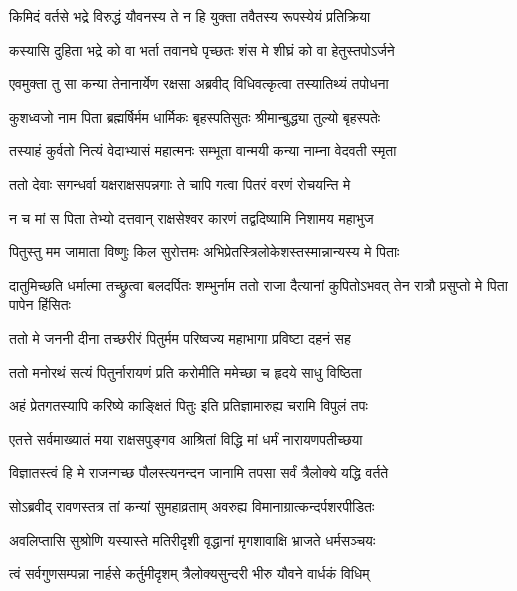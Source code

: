 \twolineshloka
{किमिदं वर्तसे भद्रे विरुद्धं यौवनस्य ते}
{न हि युक्ता तवैतस्य रूपस्येयं प्रतिक्रिया} %

\twolineshloka
{कस्यासि दुहिता भद्रे को वा भर्ता तवानघे}
{पृच्छतः शंस मे शीघ्रं को वा हेतुस्तपोऽर्जने} %

\twolineshloka
{एवमुक्ता तु सा कन्या तेनानार्येण रक्षसा}
{अब्रवीद् विधिवत्कृत्वा तस्यातिथ्यं तपोधना} %

\twolineshloka
{कुशध्वजो नाम पिता ब्रह्मर्षिर्मम धार्मिकः}
{बृहस्पतिसुतः श्रीमान्बुद्ध्या तुल्यो बृहस्पतेः} %

\twolineshloka
{तस्याहं कुर्वतो नित्यं वेदाभ्यासं महात्मनः}
{सम्भूता वान्मयी कन्या नाम्ना वेदवती स्मृता} %

\twolineshloka
{ततो देवाः सगन्धर्वा यक्षराक्षसपन्नगाः}
{ते चापि गत्वा पितरं वरणं रोचयन्ति मे} %

\twolineshloka
{न च मां स पिता तेभ्यो दत्तवान् राक्षसेश्वर}
{कारणं तद्वदिष्यामि निशामय महाभुज} %

\twolineshloka
{पितुस्तु मम जामाता विष्णुः किल सुरोत्तमः}
{अभिप्रेतस्त्रिलोकेशस्तस्मान्नान्यस्य मे पिताः} %

\threelineshloka
{दातुमिच्छति धर्मात्मा तच्छ्रुत्वा बलदर्पितः}
{शम्भुर्नाम ततो राजा दैत्यानां कुपितोऽभवत्}
{तेन रात्रौ प्रसुप्तो मे पिता पापेन हिंसितः} %

\twolineshloka
{ततो मे जननी दीना तच्छरीरं पितुर्मम}
{परिष्वज्य महाभागा प्रविष्टा दहनं सह} %

\twolineshloka
{ततो मनोरथं सत्यं पितुर्नारायणं प्रति}
{करोमीति ममेच्छा च हृदये साधु विष्ठिता} %

\twolineshloka
{अहं प्रेतगतस्यापि करिष्ये काङ्क्षितं पितुः}
{इति प्रतिज्ञामारुह्य चरामि विपुलं तपः} %

\twolineshloka
{एतत्ते सर्वमाख्यातं मया राक्षसपुङ्गव}
{आश्रितां विद्धि मां धर्मं नारायणपतीच्छया} %

\twolineshloka
{विज्ञातस्त्वं हि मे राजन्गच्छ पौलस्त्यनन्दन}
{जानामि तपसा सर्वं त्रैलोक्ये यद्धि वर्तते} %

\twolineshloka
{सोऽब्रवीद् रावणस्तत्र तां कन्यां सुमहाव्रताम्}
{अवरुह्य विमानाग्रात्कन्दर्पशरपीडितः} %

\twolineshloka
{अवलिप्तासि सुश्रोणि यस्यास्ते मतिरीदृशी}
{वृद्धानां मृगशावाक्षि भ्राजते धर्मसञ्चयः} %

\twolineshloka
{त्वं सर्वगुणसम्पन्ना नार्हसे कर्तुमीदृशम्}
{त्रैलोक्यसुन्दरी भीरु यौवने वार्धकं विधिम्} %

